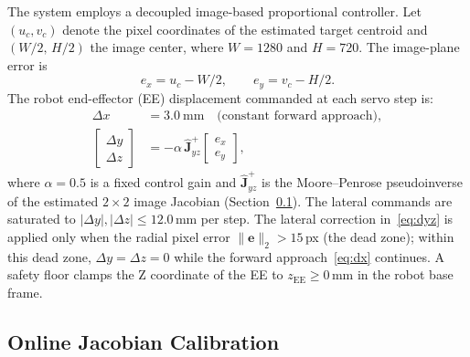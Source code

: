 \documentclass[lettersize,journal]{IEEEtran}
\begin{document}
The system employs a decoupled image-based proportional controller.
Let $(u_c, v_c)$ denote the pixel coordinates of the estimated target
centroid and $(W/2,\,H/2)$ the image center, where $W=1280$ and $H=720$.
The image-plane error is
\begin{equation}
  e_x = u_c - W/2, \qquad e_y = v_c - H/2.
  \label{eq:pixerr}
\end{equation}
The robot end-effector (EE) displacement commanded at each servo step is:
\begin{align}
  \Delta x &= 3.0\ \text{mm} \quad \text{(constant forward approach)},
  \label{eq:dx}\\
  \begin{bmatrix}\Delta y \\ \Delta z\end{bmatrix}
  &= -\alpha\,\hat{\mathbf{J}}^{+}_{yz}
     \begin{bmatrix}e_x \\ e_y\end{bmatrix},
  \label{eq:dyz}
\end{align}
where $\alpha = 0.5$ is a fixed control gain and $\hat{\mathbf{J}}^{+}_{yz}$
is the Moore--Penrose pseudoinverse of the estimated $2\times2$ image Jacobian
(Section~\ref{sec:jacobian}). The lateral commands are saturated to
$|\Delta y|, |\Delta z| \leq 12.0$\,mm per step.
The lateral correction in~\eqref{eq:dyz} is applied only when the radial
pixel error $\lVert\mathbf{e}\rVert_2 > 15$\,px (the dead zone); within this
dead zone, $\Delta y = \Delta z = 0$ while the forward approach~\eqref{eq:dx}
continues.  A safety floor clamps the Z coordinate of the EE to
$z_{\text{EE}} \geq 0$\,mm in the robot base frame.

\subsection{Online Jacobian Calibration}
\label{sec:jacobian}
\end{document}
